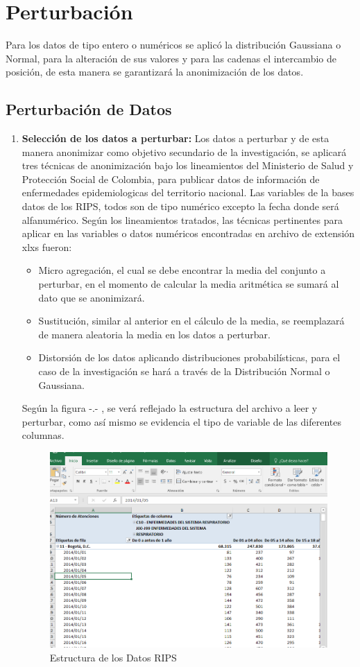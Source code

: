 \documentclass[a4paper,openright,12pt]{book}
\theoremstyle{definition}
\theoremstyle{remark}
\begin{document}
\section{Perturbación}
Para los datos de tipo entero o numéricos se aplicó la distribución Gaussiana o Normal, para la alteración de sus valores y para las cadenas el intercambio de posición, de esta manera se garantizará la anonimización de los datos.
    
    \subsection{Perturbación de Datos}

\begin{enumerate}
	\item \textbf{Selección de los datos a perturbar:} Los datos a perturbar y de esta manera anonimizar como objetivo secundario de la investigación, se aplicará tres técnicas de anonimización bajo los lineamientos del Ministerio de Salud y Protección Social de Colombia, para publicar datos de información de enfermedades epidemiologicas del territorio nacional. Las variables de la bases datos de los RIPS, todos son de tipo numérico excepto la fecha donde será alfanumérico. Según los lineamientos tratados, las técnicas pertinentes para aplicar en las variables o datos numéricos encontradas en archivo de extensión xlxs fueron:
    \begin{itemize}
    	\item Micro agregación, el cual se debe encontrar la media del conjunto a perturbar, en el momento de calcular la media aritmética se sumará al dato que se anonimizará.
        \item Sustitución, similar al anterior en el cálculo de la media, se reemplazará de manera aleatoria la media en los datos a perturbar.
        \item Distorsión de los datos aplicando distribuciones probabilísticas, para el caso de la investigación se hará a través de la Distribución Normal o Gaussiana. 
    \end{itemize}
Según la figura -.- , se verá reflejado la estructura del archivo a leer y perturbar, como así mismo se evidencia el tipo de variable de las diferentes columnas.
  \begin{figure}[ht]
\centering
\caption{Estructura de los Datos RIPS} 
 \includegraphics[scale=0.6]{Datos_Rips}

\end{figure}
\end{enumerate}
\end{document}
